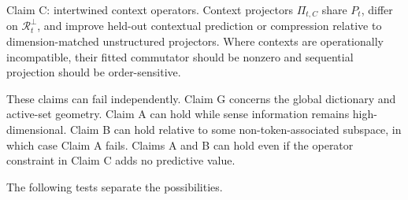 \documentclass[
  aps,
  reprint,
  superscriptaddress,
  floatfix,
  nofootinbib,
  longbibliography
]{revtex4-2}
\begin{document}
{Claim C: intertwined context operators.}
Context projectors $\Pi_{t,C}$ share $P_t$, differ on
$\mathcal R_t^\perp$, and improve held-out contextual prediction or
compression relative to dimension-matched unstructured projectors.  Where
contexts are operationally incompatible, their fitted commutator should be
nonzero and sequential projection should be order-sensitive.

These claims can fail independently. Claim G concerns the global dictionary
and active-set geometry. Claim A can hold while sense
information remains high-dimensional. Claim B can hold relative to some
non-token-associated subspace, in which case Claim A fails. Claims A and B can
hold even if the operator constraint in Claim C adds no predictive value.

The following tests separate the possibilities.
\end{document}
